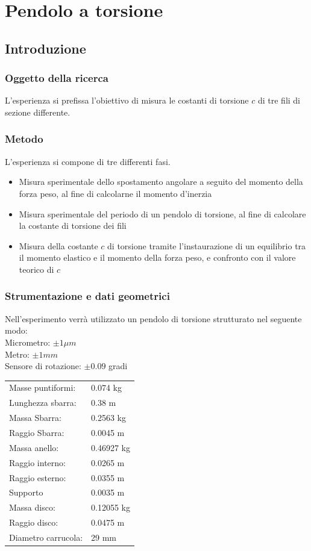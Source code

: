 \chapter{Pendolo a torsione}
\section{Introduzione}
\subsection{Oggetto della ricerca}
L'esperienza si prefissa l'obiettivo di misura le costanti di torsione $c$ di tre fili di sezione differente. 
\subsection{Metodo}
L'esperienza si compone di tre differenti fasi.
\begin{itemize}
\item Misura sperimentale dello spostamento angolare a seguito del momento della forza peso, al fine di calcolarne il momento d'inerzia 
\item Misura sperimentale del periodo di un pendolo di torsione, al fine di calcolare la costante di torsione dei fili
\item Misura della costante $c$ di torsione tramite l'instaurazione di un equilibrio tra il momento elastico e il momento della forza peso, e confronto con il valore teorico di $c$
\end{itemize}
\subsection{ Strumentazione e dati geometrici}
Nell'esperimento verrà utilizzato un pendolo di torsione strutturato nel seguente modo:
\\
Micrometro: $ \pm 1 \mu m$
 \\
Metro: $\pm 1 mm$
\\
Sensore di rotazione: $\pm 0.09$ gradi
\\

\begin{tabular}{ll}
Masse puntiformi: & 0.074 kg\\
Lunghezza sbarra: & 0.38 m\\
Massa Sbarra: & 0.2563 kg\\
Raggio Sbarra: & 0.0045 m\\
\midrule
Massa anello: & 0.46927 kg\\
Raggio interno: & 0.0265 m\\
Raggio esterno: & 0.0355 m\\
\midrule
Supporto & 0.0035 m\\
\midrule
Massa disco: & 0.12055 kg\\
Raggio disco: & 0.0475 m\\
Diametro carrucola: & 29 mm\\
\end{tabular}

